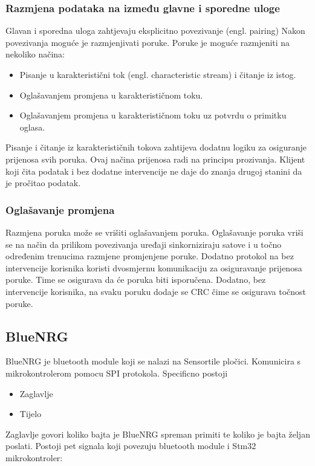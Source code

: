 \documentclass[times, utf8, diplomski]{diplomski}
\begin{document}
\subsubsection {Razmjena podataka na između glavne i sporedne uloge}
Glavan i sporedna uloga zahtjevaju eksplicitno povezivanje (engl. pairing) Nakon povezivanja moguće je razmjenjivati poruke. Poruke je moguće razmjeniti na nekoliko načina:

\begin{itemize}
  \item Pisanje u karakteristični tok (engl. characteristic stream) i čitanje iz istog.
  \item Oglašavanjem promjena u karakterističnom toku.
  \item Oglašavanjem promjena u karakterističnom toku uz potvrdu o primitku oglasa.
\end{itemize}

Pisanje i čitanje iz karakterističnih tokova zahtijeva dodatnu logiku za osiguranje prijenosa svih poruka. Ovaj načina prijenosa radi na principu prozivanja. Klijent koji čita podatak i bez dodatne intervencije ne daje do znanja drugoj stanini da je pročitao podatak.

\subsubsection {Oglašavanje promjena}
Razmjena poruka može se vrišiti oglašavanjem poruka. Oglašavanje poruka vriši se na način da prilikom povezivanja uređaji sinkorniziraju satove i u točno određenim trenucima razmjene promjenjene poruke. Dodatno protokol na bez intervencije korisnika koristi dvosmjernu komunikaciju za osiguravanje prijenosa poruke. Time se osigurava da će poruka biti isporučena. Dodatno, bez intervencije korisnika, na svaku poruku dodaje se CRC čime se osigurava točnost poruke.

\subsection{BlueNRG}
BlueNRG je bluetooth module koji se nalazi na Sensortile pločici. Komunicira s mikrokontrolerom pomocu SPI protokola.
Specificno postoji

\begin{itemize}
  \item Zaglavlje
  \item Tijelo
\end{itemize}

Zaglavlje govori koliko bajta je BlueNRG spreman primiti te koliko je bajta željan poslati.
Postoji pet signala koji povezuju bluetooth module i Stm32 mikrokontroler:
\end{document}

